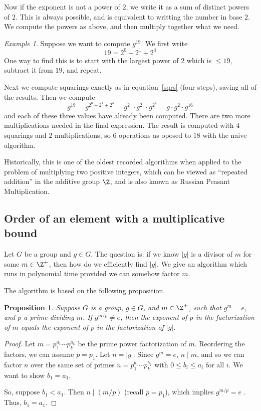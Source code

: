 \documentclass[12pt]{amsart}
\theoremstyle{plain}
\newtheorem{prop}[thm]{Proposition}
\theoremstyle{definition}
\theoremstyle{remark}
\newtheorem*{exam}{Example}
\begin{document}
Now if the exponent is not a power of $2$, we write it as a sum of
distinct powers of $2$.  This is always possible, and is equivalent to
writting the number in base $2$.  We compute the powers as above, and
then multiply together what we need.
\begin{exam}
  Suppose we want to compute $g^{19}$.  We first write
  \[ 19=2^0+2^1+2^4\]
  One way to find this is to start with the largest power of $2$ which
  is $\leq 19$, subtract it from $19$, and repeat.

  Next we compute squarings exactly as in equation~\eqref{sqrs} (four
  steps), saving all of the results.  Then we compute
  \[ g^{19} = g^{2^0+2^1+2^4} = g^{2^0}\cdot g^{2^1}\cdot g^{2^4}
  = g\cdot g^2\cdot g^{16}\]
and each of these three values have already been computed.  There are
two more multiplications needed in the final expression.  The result
is computed with $4$ squarings and $2$ multiplications, so $6$
operations as oposed to $18$ with the naive algorithm.
\end{exam}

Historically, this is one of the oldest recorded algorithms when
applied to the problem of multiplying two positive integers, which can
be viewed as ``repeated addition'' in the additive group $\Z$, and is
also known as Russian Peasant Multiplication.

\subsection{Order of an element with a multiplicative bound}
Let $G$ be a group and $g\in G$.  The question is: if we know $|g|$ is
a divisor of $m$ for some $m\in\Z^+$, then how do we efficiently find
$|g|$.  We give an algorithm which runs in polynomial time provided we
can somehow factor $m$.  

The algorithm is based on the following proposition.

\begin{prop}
  Suppose $G$ is a group, $g\in G$, and $m\in\Z^+$, such that $g^m=e$,
  and $p$ a prime dividing $m$.  If $g^{m/p}\neq e$, then the exponent
  of $p$ in the factorization of $m$ equals the exponent of $p$ in the
  factorization of $|g|$.
\end{prop}
\begin{proof}
  Let $m=p_1^{a_1}\cdots p_k^{a_k}$ be the prime power factorization
  of $m$.  Reordering the factors, we can assume $p=p_1$.  Let
  $n=|g|$.  Since $g^m=e$, $n\mid m$, and so we can factor $n$ over
  the same set of primes $n=p_1^{b_1}\cdots p_k^{b_k}$ with $0\leq
  b_i\leq a_i$ for all $i$.  We want to show $b_1=a_1$.

  So, suppose $b_1<a_1$.  Then $n\mid (m/p)$ (recall $p=p_1$), which
  implies $g^{m/p}=e$ \con.  Thus, $b_1=a_1$.
\end{proof}
\end{document}

